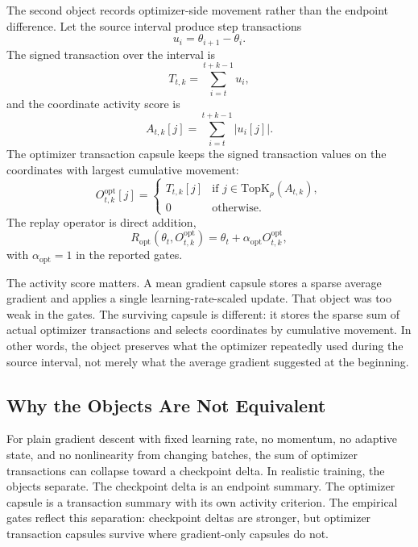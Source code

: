 \documentclass{article}
\begin{document}
The second object records optimizer-side movement rather than the endpoint
difference. Let the source interval produce step transactions
\begin{equation}
  u_i = \theta_{i+1} - \theta_i.
\end{equation}
The signed transaction over the interval is
\begin{equation}
  T_{t,k} = \sum_{i=t}^{t+k-1} u_i,
\end{equation}
and the coordinate activity score is
\begin{equation}
  A_{t,k}[j] = \sum_{i=t}^{t+k-1} |u_i[j]|.
\end{equation}
The optimizer transaction capsule keeps the signed transaction values on the
coordinates with largest cumulative movement:
\begin{equation}
  O^{\mathrm{opt}}_{t,k}[j] =
  \begin{cases}
    T_{t,k}[j] & \text{if } j \in \mathrm{TopK}_{\rho}(A_{t,k}), \\
    0 & \text{otherwise.}
  \end{cases}
  \label{eq:optimizer_capsule}
\end{equation}
The replay operator is direct addition,
\begin{equation}
  R_{\mathrm{opt}}(\theta_t,O^{\mathrm{opt}}_{t,k})
  = \theta_t + \alpha_{\mathrm{opt}} O^{\mathrm{opt}}_{t,k},
\end{equation}
with $\alpha_{\mathrm{opt}}=1$ in the reported gates.

The activity score matters. A mean gradient capsule stores a sparse average
gradient and applies a single learning-rate-scaled update. That object was too
weak in the gates. The surviving capsule is different: it stores the sparse
sum of actual optimizer transactions and selects coordinates by cumulative
movement. In other words, the object preserves what the optimizer repeatedly
used during the source interval, not merely what the average gradient suggested
at the beginning.

\subsection{Why the Objects Are Not Equivalent}

For plain gradient descent with fixed learning rate, no momentum, no adaptive
state, and no nonlinearity from changing batches, the sum of optimizer
transactions can collapse toward a checkpoint delta. In realistic training,
the objects separate. The checkpoint delta is an endpoint summary. The
optimizer capsule is a transaction summary with its own activity criterion.
The empirical gates reflect this separation: checkpoint deltas are stronger,
but optimizer transaction capsules survive where gradient-only capsules do not.
\end{document}
